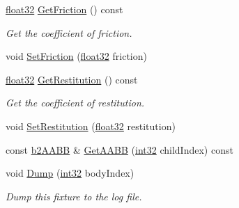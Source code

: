 \begin{DoxyCompactItemize}
\mbox{\hyperlink{b2_settings_8h_aacdc525d6f7bddb3ae95d5c311bd06a1}{float32}} \mbox{\hyperlink{classb2_fixture_a2853d799f299cb1ce76e48261d42a5ad}{Get\+Friction}} () const
\begin{DoxyCompactList}\small\item\em Get the coefficient of friction. \end{DoxyCompactList}\item 
void \mbox{\hyperlink{classb2_fixture_ad0cd91eef5858c8ef1d6b62cc2a34ea2}{Set\+Friction}} (\mbox{\hyperlink{b2_settings_8h_aacdc525d6f7bddb3ae95d5c311bd06a1}{float32}} friction)
\item 
\mbox{\hyperlink{b2_settings_8h_aacdc525d6f7bddb3ae95d5c311bd06a1}{float32}} \mbox{\hyperlink{classb2_fixture_ac30becb6f936a9cc825952ca2b40aa14}{Get\+Restitution}} () const
\begin{DoxyCompactList}\small\item\em Get the coefficient of restitution. \end{DoxyCompactList}\item 
void \mbox{\hyperlink{classb2_fixture_a19c507332e4f7bd04a05f00426f11ee4}{Set\+Restitution}} (\mbox{\hyperlink{b2_settings_8h_aacdc525d6f7bddb3ae95d5c311bd06a1}{float32}} restitution)
\item 
const \mbox{\hyperlink{structb2_a_a_b_b}{b2\+A\+A\+BB}} \& \mbox{\hyperlink{classb2_fixture_a158574dc389fec83a05b09ab715c4474}{Get\+A\+A\+BB}} (\mbox{\hyperlink{b2_settings_8h_a43d43196463bde49cb067f5c20ab8481}{int32}} child\+Index) const
\item 
void \mbox{\hyperlink{classb2_fixture_a57485e73a2063060e320c7176676cd5e}{Dump}} (\mbox{\hyperlink{b2_settings_8h_a43d43196463bde49cb067f5c20ab8481}{int32}} body\+Index)
\begin{DoxyCompactList}\small\item\em Dump this fixture to the log file. \end{DoxyCompactList}\end{DoxyCompactItemize}

